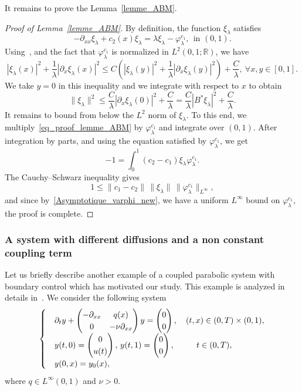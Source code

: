 \documentclass[11pt]{article}
\theoremstyle{definition}
\numberwithin{equation}{section}
\numberwithin{figure}{section}
\numberwithin{table}{section}
\newcommand{\fprop}[2]{\varphi^{#1}_{#2}}
\newcommand{\R}{\mathbb{R}}
\let\oldforall\forall
\renewcommand*{\forall}{\mathrel{\oldforall}}
\begin{document}
It remains to prove the Lemma~\ref{lemme_ABM}.
\begin{proof}[Proof of Lemma~\ref{lemme_ABM}]
By definition, the function $\xi_\lambda$ satisfies
\begin{equation}\label{eq_proof_lemme_ABM}
-\partial_{xx}\xi_\lambda + c_2(x) \xi_\lambda = \lambda \xi_\lambda - \fprop{c_1}{\lambda}, \ \ \text{in $(0,1)$}.
\end{equation}
Using~\cite[Lemmas~2.2 and 2.3]{ABM_2018}, and the fact that $\fprop{c_1}{\lambda}$ is normalized in $L^2(0,1;\R)$, we have
\[
|\xi_\lambda(x)|^2 + \frac{1}{\lambda} |\partial_x \xi_\lambda(x)|^2 \leq C \left(|\xi_\lambda(y)|^2 + \frac{1}{\lambda} |\partial_x \xi_\lambda(y)|^2\right) + \frac{C}{\lambda}, \ \forall x,y\in [0,1].
\]
We take $y=0$ in this inequality and we integrate with respect to $x$ to obtain
\[
\|\xi_\lambda\|^2 \leq \frac{C}{\lambda} |\partial_x \xi_\lambda(0)|^2 + \frac{C}{\lambda} = \frac{C}{\lambda} |B^*\xi_\lambda|^2 + \frac{C}{\lambda}.
\]
It remains to bound from below the $L^2$ norm of $\xi_\lambda$. To this end, we multiply~\eqref{eq_proof_lemme_ABM} by $\fprop{c_1}{\lambda}$ and integrate over $(0,1)$. After integration by parts, and using the equation satisfied by $\fprop{c_1}{\lambda}$, we get
\[
-1 = \int_0^1 (c_2-c_1) \xi_\lambda \fprop{c_1}{\lambda}.
\]
The Cauchy--Schwarz inequality gives
\[
1\leq \|c_1-c_2\|\,\|\xi_\lambda\|\,\|\fprop{c_1}{\lambda}\|_{L^\infty},
\]
and since by~\eqref{Asymptotique_varphi_new}, we have a uniform $L^\infty$ bound on $\fprop{c_1}{\lambda}$, the proof is complete.
\end{proof}

\subsubsection{A system with different diffusions and a non constant coupling term}

Let us briefly describe another example of a coupled parabolic system with boundary control which has motivated our study. This example is analyzed in details in~\cite{Samb18}. We consider the following system
\begin{equation}\label{systeme_elhadji}
\begin{cases}
& \partial_t y +
\begin{pmatrix} - \partial_{xx} & q(x) \\ 0 & - \nu \partial_{xx}
\end{pmatrix} y =
\begin{pmatrix} 0 \\ 0
\end{pmatrix},
\quad (t,x) \in (0,T) \times (0,1),
\\
&y(t,0) =
\begin{pmatrix} 0 \\ u(t)
\end{pmatrix},\, y(t,1) =
\begin{pmatrix} 0 \\ 0
\end{pmatrix}, \mkern 48mu t\in (0,T),
\\[0.15em]
&y(0,x) = y_0(x),
\end{cases}
\end{equation}
where $q\in L^\infty(0,1)$ and $\nu>0$.
\end{document}
